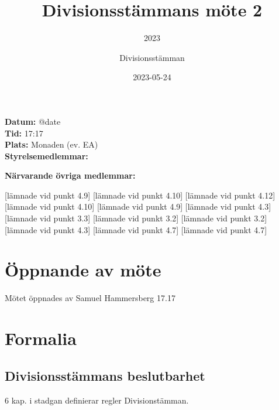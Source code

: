 \documentclass[protokoll]{dvd}
\begin{document}
\title{Divisionsstämmans möte 2}
\subtitle{2023}
\author{Divisionsstämman}
\date{2023-05-24}

\textbf{Datum:} \csname @date\endcsname\\
\textbf{Tid:} 17:17\\
\textbf{Plats:} Monaden (ev. EA)\\
\textbf{Styrelsemedlemmar:}
\begin{närvarande_förtroendevalda}
\end{närvarande_förtroendevalda}

\textbf{Närvarande övriga medlemmar:}
\begin{närvarande_medlemmar}
[lämnade vid punkt 4.9]
[lämnade vid punkt 4.10]
[lämnade vid punkt 4.12]
[lämnade vid punkt 4.10]
[lämnade vid punkt 4.9]
[lämnade vid punkt 4.3]
[lämnade vid punkt 3.3]
[lämnade vid punkt 3.2]
[lämnade vid punkt 3.2]
[lämnade vid punkt 4.3]
[lämnade vid punkt 4.7]
[lämnade vid punkt 4.7]
\end{närvarande_medlemmar}

\newpage
\section{Öppnande av möte}
Mötet öppnades av Samuel Hammersberg 17.17

\section{Formalia}

\subsection{Divisionsstämmans beslutbarhet}

6 kap. i stadgan definierar regler Divisionstämman.
\end{document}
